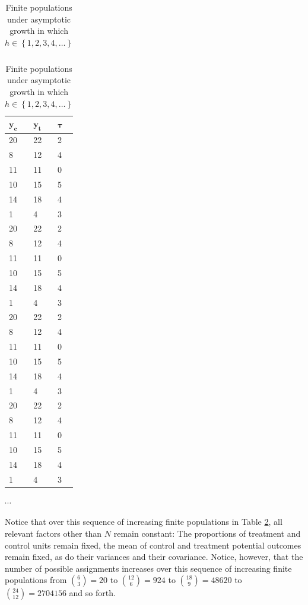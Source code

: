 \documentclass[12pt,leqno]{article}
\theoremstyle{newstyle}
\begin{document}
\begin{table}[H]
\begin{tabular}{l|l|l}
\end{tabular}
\hfill
\begin{tabular}{l|l|l}
$\mathbf{y_c}$ & $\mathbf{y_t}$ & $\pmb{\tau}$ \\ \midrule
20 & 22 &  2 \\
8  & 12 &  4 \\
11 & 11 &  0 \\
10 & 15 &  5 \\
14 & 18 &  4 \\
1  &  4 &  3 \\ \midrule
20 & 22 &  2 \\
8  & 12 &  4 \\
11 & 11 &  0 \\
10 & 15 &  5 \\
14 & 18 &  4 \\
1  &  4 &  3 \\ \midrule
20 & 22 &  2 \\
8  & 12 &  4 \\
11 & 11 &  0 \\
10 & 15 &  5 \\
14 & 18 &  4 \\
1  &  4 &  3 \\ \midrule
20 & 22 &  2 \\
8  & 12 &  4 \\
11 & 11 &  0 \\
10 & 15 &  5 \\
14 & 18 &  4 \\
1  &  4 &  3
\end{tabular}
$\cdots$
\caption{Finite populations under asymptotic growth in which $h \in \left\{1, 2, 3, 4, \ldots \right\}$}
\label{tab: asymp growth}
\end{table}

Notice that over this sequence of increasing finite populations in Table
\ref{tab: asymp growth}, all relevant factors other than \(N\) remain
constant: The proportions of treatment and control units remain fixed,
the mean of control and treatment potential outcomes remain fixed, as do
their variances and their covariance. Notice, however, that the number
of possible assignments increases over this sequence of increasing
finite populations from \(\binom{6}{3} = 20\) to \(\binom{12}{6} = 924\)
to \(\binom{18}{9} = 48620\) to \(\binom{24}{12} = 2704156\) and so
forth.
\end{document}
